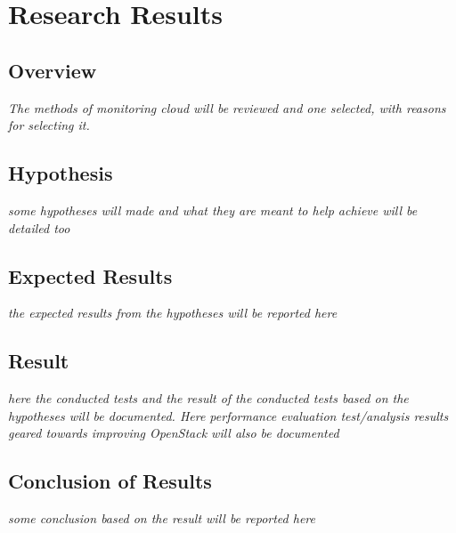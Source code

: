 \chapter{Research Results}\label{chapter:results}
\section{Overview}
\textit{The methods of monitoring cloud will be reviewed and one selected, with reasons for selecting it.}

\section{Hypothesis}
\textit{some hypotheses will made and what they are meant to help achieve will be detailed too}
\section{Expected Results}
\textit{the expected results from the hypotheses will be reported here}
\section{Result}
\textit{here the conducted tests and the result of the conducted tests based on the hypotheses will be documented. Here performance evaluation test/analysis results geared towards improving OpenStack will also be documented}
\section{Conclusion of Results}
\textit{some conclusion based on the result will be reported here}
